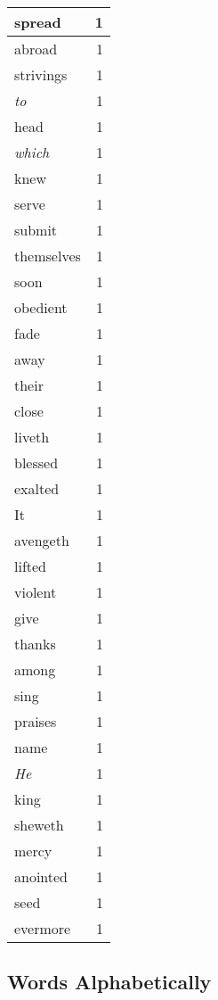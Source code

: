 \begin{center}
\begin{longtable}{l|r}
spread & 1 \\ \hline
abroad & 1 \\ \hline
strivings & 1 \\ \hline
\emph{to} & 1 \\ \hline
head & 1 \\ \hline
\emph{which} & 1 \\ \hline
knew & 1 \\ \hline
serve & 1 \\ \hline
submit & 1 \\ \hline
themselves & 1 \\ \hline
soon & 1 \\ \hline
obedient & 1 \\ \hline
fade & 1 \\ \hline
away & 1 \\ \hline
their & 1 \\ \hline
close & 1 \\ \hline
liveth & 1 \\ \hline
blessed & 1 \\ \hline
exalted & 1 \\ \hline
It & 1 \\ \hline
avengeth & 1 \\ \hline
lifted & 1 \\ \hline
violent & 1 \\ \hline
give & 1 \\ \hline
thanks & 1 \\ \hline
among & 1 \\ \hline
sing & 1 \\ \hline
praises & 1 \\ \hline
name & 1 \\ \hline
\emph{He} & 1 \\ \hline
king & 1 \\ \hline
sheweth & 1 \\ \hline
mercy & 1 \\ \hline
anointed & 1 \\ \hline
seed & 1 \\ \hline
evermore & 1 \\ \hline
\end{longtable}
\end{center}



\normalsize



\subsection{Words Alphabetically}

